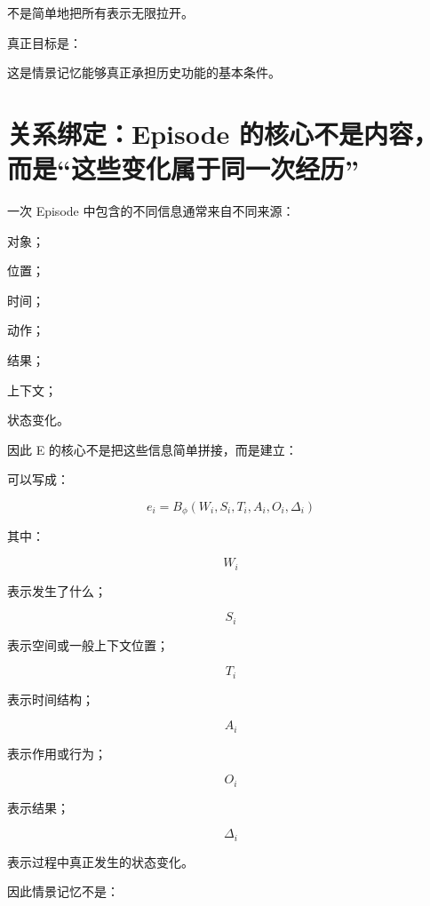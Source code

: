 不是简单地把所有表示无限拉开。

真正目标是：

\begin{statementbox}
\centering
{}
\end{statementbox}

这是情景记忆能够真正承担历史功能的基本条件。


\section{关系绑定：Episode 的核心不是内容，而是“这些变化属于同一次经历”}

一次 Episode 中包含的不同信息通常来自不同来源：

对象；

位置；

时间；

动作；

结果；

上下文；

状态变化。

因此 E 的核心不是把这些信息简单拼接，而是建立：

\begin{statementbox}
\centering
{}
\end{statementbox}

可以写成：

\[
\boxed{
e_i
=
B_{\phi}
(
W_i,
S_i,
T_i,
A_i,
O_i,
\Delta_i
)
}
\]

其中：

\[
W_i
\]

表示发生了什么；

\[
S_i
\]

表示空间或一般上下文位置；

\[
T_i
\]

表示时间结构；

\[
A_i
\]

表示作用或行为；

\[
O_i
\]

表示结果；

\[
\Delta_i
\]

表示过程中真正发生的状态变化。

因此情景记忆不是：

\begin{statementbox}
\centering
{}
\end{statementbox}

